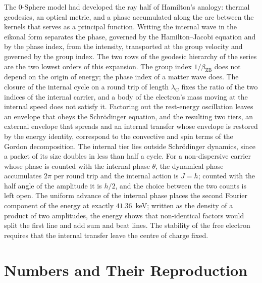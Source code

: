 \documentclass[%
 reprint, amsmath,amssymb, aps, prb, ]{revtex4-2}
\numberwithin{equation}{section}
\newcommand{\iphase}{\theta}  %
\newcommand{\lambdaC}{\lambda_{\mathrm{C}}}
\newcommand{\bZB}{\beta_{\mathrm{ZB}}}
\begin{document}
The 0-Sphere model had developed the ray half of Hamilton's analogy: thermal geodesics, an optical metric, and a phase accumulated along the arc between the kernels that serves as a principal function. Writing the internal wave in the eikonal form separates the phase, governed by the Hamilton--Jacobi equation and by the phase index, from the intensity, transported at the group velocity and governed by the group index. The two rows of the geodesic hierarchy of the series are the two lowest orders of this expansion. The group index $1/\bZB$ does not depend on the origin of energy; the phase index of a matter wave does. The closure of the internal cycle on a round trip of length $\lambdaC$ fixes the ratio of the two indices of the internal carrier, and a body of the electron's mass moving at the internal speed does not satisfy it. Factoring out the rest-energy oscillation leaves an envelope that obeys the Schr\"odinger equation, and the resulting two tiers, an external envelope that spreads and an internal transfer whose envelope is restored by the energy identity, correspond to the convective and spin terms of the Gordon decomposition. The internal tier lies outside Schr\"odinger dynamics, since a packet of its size doubles in less than half a cycle. For a non-dispersive carrier whose phase is counted with the internal phase $\iphase$, the dynamical phase accumulates $2\pi$ per round trip and the internal action is $J = h$; counted with the half angle of the amplitude it is $h/2$, and the choice between the two counts is left open. The uniform advance of the internal phase places the second Fourier component of the energy at exactly $41.36$~keV; written as the density of a product of two amplitudes, the energy shows that non-identical factors would split the first line and add sum and beat lines. The stability of the free electron requires that the internal transfer leave the centre of charge fixed.

\appendix

\section{Numbers and Their Reproduction}
\label{app:numbers}
\end{document}
